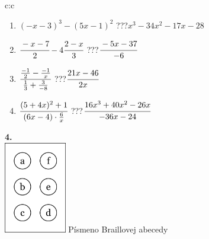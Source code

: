 \documentclass[10pt]{report}
\begin{document}
\begin{tabular}{c:c}
\begin{minipage}[c][104.5mm][t]{0.5\linewidth}
\begin{center}
\begin{minipage}{0.79\linewidth}
\begin{center}
\begin{varwidth}{\linewidth}
\begin{enumerate}
\item $(-x-3)^3-(5x-1)^2$\quad \dotfill\; ???\;\dotfill \quad $x^3-34x^2-17x-28$
\item $\cfrac{-x-7}{2}-4\cfrac{2-x}{3}$\quad \dotfill\; ???\;\dotfill \quad $\cfrac{-5x-37}{-6}$
\item $\cfrac{\frac{-1}{2}-\frac{-1}{x}}{\frac{1}{3}+\frac{3}{-8}}$\quad \dotfill\; ???\;\dotfill \quad $\cfrac{21x-46}{2x}$
\item $\cfrac{(5+4x)^2+1}{(6x-4)\cdot\frac{6}{x}}$\quad \dotfill\; ???\;\dotfill \quad $\cfrac{16x^3+40x^2-26x}{-36x-24}$
\end{enumerate}
\end{varwidth}
\end{center}
\end{minipage}
\begin{minipage}{0.20\linewidth}
\begin{center}
{\Huge\bfseries 4.} \\[2mm]
\includegraphics[height=40mm]{../images/braille.png}
{\small Písmeno Braillovej abecedy}
\end{center}
\end{minipage}
\end{center}
\end{minipage}
%
\end{tabular}
\newpage
\thispagestyle{empty}
\end{document}

